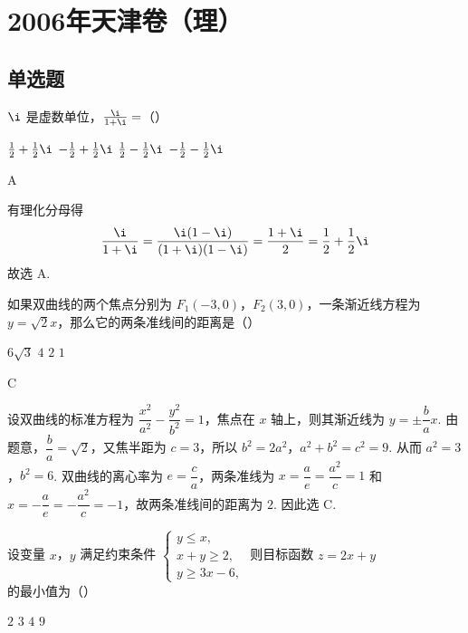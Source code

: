 
\chapter{2006年天津卷（理）}
\section{单选题}
\begin{problem}
\(\i\) 是虚数单位，\(\frac{\i}{1+\i}=\)（\quad）

\choices
    {\(\frac{1}{2}+\frac{1}{2}\i\)}
    {\(-\frac{1}{2}+\frac{1}{2}\i\)}
    {\(\frac{1}{2}-\frac{1}{2}\i\)}
    {\(-\frac{1}{2}-\frac{1}{2}\i\)}
\end{problem}

\begin{answer}
A
\end{answer}

\begin{solution}
有理化分母得
\[
\frac{\i}{1+\i}=\frac{\i(1-\i)}{(1+\i)(1-\i)}=\frac{1+\i}{2}=\frac{1}{2}+\frac{1}{2}\i
\]
故选 A.
\end{solution}

\begin{problem}
如果双曲线的两个焦点分别为 \(F_{1}(-3,0)\)，\(F_{2}(3,0)\)，一条渐近线方程为 \(y=\sqrt{2}x\)，那么它的两条准线间的距离是（\quad）

\choices
    {\(6\sqrt{3}\)}
    {\(4\)}
    {\(2\)}
    {\(1\)}
\end{problem}

\begin{answer}
C
\end{answer}

\begin{solution}
设双曲线的标准方程为 \(\dfrac{x^{2}}{a^{2}}-\dfrac{y^{2}}{b^{2}}=1\)，焦点在 \(x\) 轴上，则其渐近线为 \(y=\pm\dfrac{b}{a}x\). 由题意，\(\dfrac{b}{a}=\sqrt{2}\)，又焦半距为 \(c=3\)，所以 \(b^{2}=2a^{2}\)，\(a^{2}+b^{2}=c^{2}=9\).
从而 \(a^{2}=3\)，\(b^{2}=6\). 双曲线的离心率为 \(e=\dfrac{c}{a}\)，两条准线为 \(x=\dfrac{a}{e}=\dfrac{a^{2}}{c}=1\) 和 \(x=-\dfrac{a}{e}=-\dfrac{a^{2}}{c}=-1\)，故两条准线间的距离为 \(2\). 因此选 C.
\end{solution}

\begin{problem}
设变量 \(x\)，\(y\) 满足约束条件 \(\begin{cases}
y\leqslant x,\\
x+y\geqslant 2,\\
y\geqslant 3x-6,
\end{cases}\) 则目标函数 \(z=2x+y\) 的最小值为（\quad）

\choices
    {\(2\)}
    {\(3\)}
    {\(4\)}
    {\(9\)}
\end{problem}

